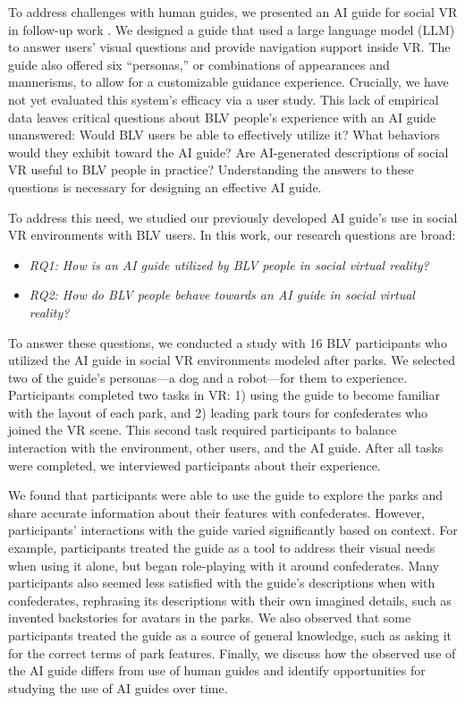 To address challenges with human guides, we presented an AI guide for social VR in follow-up work \cite{collins2024ai}. We designed a guide that used a large language model (LLM) to answer users’ visual questions and provide navigation support inside VR. The guide also offered six “personas,” or combinations of appearances and mannerisms, to allow for a customizable guidance experience. Crucially, we have not yet evaluated this system's efficacy via a user study. This lack of empirical data leaves critical questions about BLV people's experience with an AI guide unanswered: Would BLV users be able to effectively utilize it? What behaviors would they exhibit toward the AI guide? Are AI-generated descriptions of social VR useful to BLV people in practice? Understanding the answers to these questions is necessary for designing an effective AI guide.

To address this need, we studied our previously developed AI guide’s \cite{collins2024ai} use in social VR environments with BLV users. In this work, our research questions are broad:  

\begin{itemize}
    \item \textit{RQ1: How is an AI guide utilized by BLV people in social virtual reality?}
    \item \textit{RQ2: How do BLV people behave towards an AI guide in social virtual reality?}
\end{itemize}

To answer these questions, we conducted a study with 16 BLV participants who utilized the AI guide in social VR environments modeled after parks. We selected two of the guide's personas—a dog and a robot—for them to experience. Participants completed two tasks in VR: 1) using the guide to become familiar with the layout of each park, and 2) leading park tours for confederates who joined the VR scene. This second task required participants to balance interaction with the environment, other users, and the AI guide. After all tasks were completed, we interviewed participants about their experience.

We found that participants were able to use the guide to explore the parks and share accurate information about their features with confederates. However, participants’ interactions with the guide varied significantly based on context. For example, participants treated the guide as a tool to address their visual needs when using it alone, but began role-playing with it around confederates. Many participants also seemed less satisfied with the guide’s descriptions when with confederates, rephrasing its descriptions with their own imagined details, such as invented backstories for avatars in the parks. We also observed that some participants treated the guide as a source of general knowledge, such as asking it for the correct terms of park features. Finally, we discuss how the observed use of the AI guide differs from use of human guides and identify opportunities for studying the use of AI guides over time.

